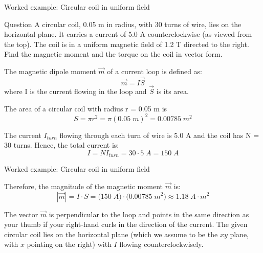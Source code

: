 {
\problemslide

%
%
%

\begin{frame}{Worked example: Circular coil in uniform field}

\begin{blockexmplque}{Question}
  A circular coil, 0.05 m in radius, with 30 turns of wire, lies on the horizontal plane.
  It carries a current of 5.0 A counterclockwise (as viewed from the top).
  The coil is in a uniform magnetic field of 1.2 T directed to the right.
  Find the magnetic moment and the torque on the coil in vector form.
\end{blockexmplque}

The magnetic dipole moment $\vec{m}$ of a current loop is defined as:
\begin{equation*}
   \vec{m} = I \vec{S}
\end{equation*}
where I is the current flowing in the loop and $\vec{S}$ is its area.

The area of a circular coil with radius r = 0.05 m is
\begin{equation*}
  S = \pi r^2 = \pi (0.05\; m)^2 = 0.00785 \; m^2
\end{equation*}

The current $I_{turn}$ flowing through each turn of wire is 5.0 A
and the coil has N = 30 turns. Hence, the total current is:
\begin{equation*}
  I = N I_{turn} = 30 \cdot 5\; A = 150 \; A
\end{equation*}

\end{frame}

%
%
%

\begin{frame}{Worked example: Circular coil in uniform field}

Therefore, the magnitude of the magnetic moment $\vec{m}$ is:
\begin{equation*}
   |\vec{m}| = I \cdot S = \Big(  150 \; A \Big) \cdot \Big( 0.00785 \; m^2 \Big) \approx 1.18 \; A \cdot m^2
\end{equation*}

The vector $\vec{m}$ is perpendicular to the loop and points in the same
direction as your thumb if your right-hand curls in the direction of the current.
The given circular coil lies on the horizontal plane
(which we assume to be the $xy$ plane, with $x$ pointing on the right)
with $I$ flowing counterclockwisely.\\


\end{frame}}
